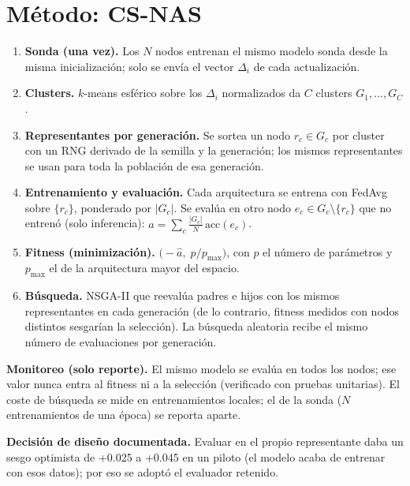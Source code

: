 \documentclass[11pt,a4paper]{article}
\newcommand{\acc}{\mathrm{acc}}
\begin{document}
\section{Método: CS-NAS}
\begin{enumerate}[leftmargin=*,itemsep=2pt]
\item \textbf{Sonda (una vez).} Los $N$ nodos entrenan el mismo modelo sonda desde la misma inicialización; solo se envía el vector $\Delta_i$ de cada actualización.
\item \textbf{Clusters.} $k$-means esférico sobre los $\Delta_i$ normalizados da $C$ clusters $G_1,\dots,G_C$.
\item \textbf{Representantes por generación.} Se sortea un nodo $r_c\in G_c$ por cluster con un RNG derivado de la semilla y la generación; los mismos representantes se usan para toda la población de esa generación.
\item \textbf{Entrenamiento y evaluación.} Cada arquitectura se entrena con FedAvg sobre $\{r_c\}$, ponderado por $|G_c|$. Se evalúa en otro nodo $e_c\in G_c\setminus\{r_c\}$ que no entrenó (solo inferencia): $\hat a=\sum_c \frac{|G_c|}{N}\,\acc(e_c)$.
\item \textbf{Fitness (minimización).} $\bigl(-\hat a,\;p/p_{\max}\bigr)$, con $p$ el número de parámetros y $p_{\max}$ el de la arquitectura mayor del espacio.
\item \textbf{Búsqueda.} NSGA-II \cite{deb2002nsga2} que reevalúa padres e hijos con los mismos representantes en cada generación (de lo contrario, fitness medidos con nodos distintos sesgarían la selección). La búsqueda aleatoria recibe el mismo número de evaluaciones por generación.
\end{enumerate}
\textbf{Monitoreo (solo reporte).} El mismo modelo se evalúa en todos los nodos; ese valor nunca entra al fitness ni a la selección (verificado con pruebas unitarias). El coste de búsqueda se mide en entrenamientos locales; el de la sonda ($N$ entrenamientos de una época) se reporta aparte.

\textbf{Decisión de diseño documentada.} Evaluar en el propio representante daba un sesgo optimista de +0.025 a +0.045 en un piloto (el modelo acaba de entrenar con esos datos); por eso se adoptó el evaluador retenido.
\end{document}
